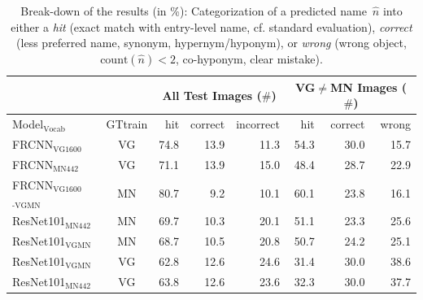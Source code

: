 \begin{table}[t]
	\centering
	\small
	\begin{tabular}{l|c|r@{~}r@{~}r@{~}||r@{~}r@{~}r@{~}}
		\toprule
		& & \multicolumn{3}{c}{All Test Images ($\#$)} 
		& \multicolumn{3}{c}{VG$\neq$MN Images ($\#$)}\\
		\toprule
		Model$_{\text{Vocab}}$	& GTtrain  
		&  hit &  correct &  incorrect &  hit &  correct &  wrong \\
		\midrule
		FRCNN$_{\text{VG1600}}$ & VG           &         74.8 &                  13.9 &                    11.3 &         54.3 &                  30.0 &                    15.7 \\
		FRCNN$_{\text{MN442}}$ & VG &         71.1 &                  13.9 &                    15.0 &         48.4 &                  28.7 &                    22.9 \\
		\midrule \midrule
		FRCNN$_{\text{VG1600}}$$_{\text{-VGMN}}$ & MN %
		&         80.7 &                   9.2 &                    10.1 &         60.1 &                  23.8 &                    16.1 \\
		\midrule
		ResNet101$_{\text{MN442}}$ & MN %
		&         69.7 &                  10.3 &                    20.1 &         51.1 &                  23.3 &                    25.6 \\
		ResNet101$_{\text{VGMN}}$ & MN%
		&         68.7 &                  10.5 &                    20.8 &         50.7 &                  24.2 &                    25.1 \\
		ResNet101$_{\text{VGMN}}$ & VG %
		&         62.8 &                  12.6 &                    24.6 &         31.4 &                  30.0 &                    38.6 \\
		ResNet101$_{\text{MN442}}$ & VG %
		&         63.8 &                  12.6 &                    23.6 &         32.3 &                  30.0 &                    37.7 \\
		\bottomrule
	\end{tabular}
	\caption{Break-down of the results (in \%): Categorization of a predicted name\ $\hat{n}$ into either a \textit{hit} (exact match with entry-level name, cf. standard evaluation), \textit{correct} (less preferred name, synonym, hypernym/hyponym), or \textit{wrong} (wrong object, $\text{count}(\hat{n})<2$, co-hyponym, clear mistake). \label{tab:exp_overview_results}}
\end{table}

